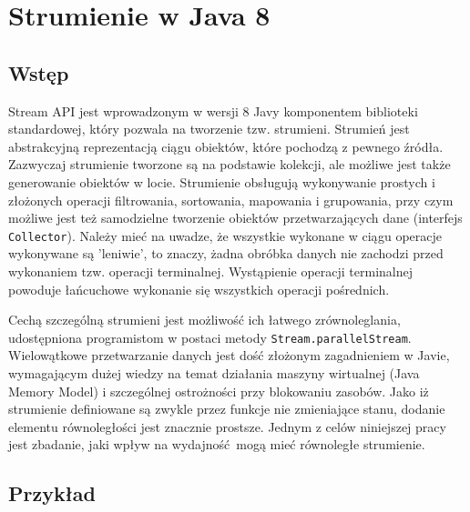 \documentclass[12pt]{extarticle}
\begin{document}
\section{Strumienie w Java 8}

\subsection{Wstęp}

    Stream API jest wprowadzonym w wersji 8 Javy komponentem biblioteki standardowej, który pozwala na tworzenie tzw. strumieni. Strumień jest abstrakcyjną reprezentacją ciągu obiektów, które pochodzą z pewnego źródła. Zazwyczaj strumienie tworzone są na podstawie kolekcji, ale możliwe jest także generowanie obiektów w locie. Strumienie obsługują wykonywanie prostych i złożonych operacji filtrowania, sortowania, mapowania i grupowania, przy czym możliwe jest też samodzielne tworzenie obiektów przetwarzających dane (interfejs \texttt{Collector}). Należy mieć na uwadze, że wszystkie wykonane w ciągu operacje wykonywane są 'leniwie', to znaczy, żadna obróbka danych nie zachodzi przed wykonaniem tzw. operacji terminalnej. Wystąpienie operacji terminalnej powoduje łańcuchowe wykonanie się wszystkich operacji pośrednich.

    Cechą szczególną strumieni jest możliwość ich łatwego zrównoleglania, udostępniona programistom w postaci metody \texttt{Stream.parallelStream}. Wielowątkowe przetwarzanie danych jest dość złożonym zagadnieniem w Javie, wymagającym dużej wiedzy na temat działania maszyny wirtualnej (Java Memory Model) i szczególnej ostrożności przy blokowaniu zasobów. Jako iż strumienie definiowane są zwykle przez funkcje nie zmieniające stanu, dodanie elementu równoległości jest znacznie prostsze. Jednym z celów niniejszej pracy jest zbadanie, jaki wpływ na wydajność mogą mieć równoległe strumienie.

\subsection{Przykład}
\end{document}
